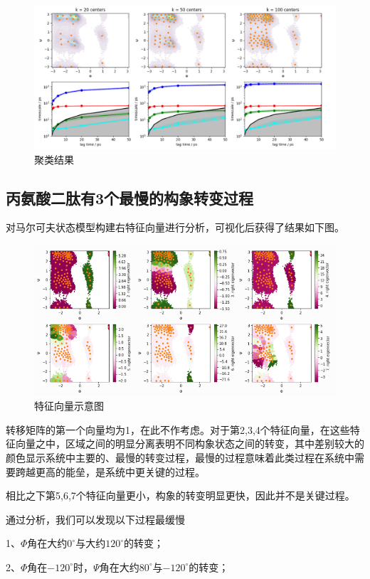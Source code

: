 \documentclass[a4paper]{article}
\begin{document}
\begin{CJK}{UTF8}{gbsn}
\begin{sloppypar}
\begin{figure}[H]
\centering
\includegraphics[scale=0.55]{impied.png}
\caption{聚类结果}
\end{figure}


	\subsection{丙氨酸二肽有3个最慢的构象转变过程}
	
	对马尔可夫状态模型构建右特征向量进行分析，可视化后获得了结果如下图。
\begin{figure}[H]
\centering
\includegraphics[scale=0.68]{right.png}
\caption{特征向量示意图}
\end{figure}
	转移矩阵的第一个向量均为1，在此不作考虑。对于第2,3,4个特征向量，在这些特征向量之中，区域之间的明显分离表明不同构象状态之间的转变，其中差别较大的颜色显示系统中主要的、最慢的转变过程，最慢的过程意味着此类过程在系统中需要跨越更高的能垒，是系统中更关键的过程。

	相比之下第5,6,7个特征向量更小，构象的转变明显更快，因此并不是关键过程。
	
	通过分析，我们可以发现以下过程最缓慢

	1、$\Phi$角在大约$0^{\circ}$与大约$120^{\circ}$的转变；

	2、$\Phi$角在$-120^{\circ}$时，$\Psi$角在大约$80^{\circ}$与$-120^{\circ}$的转变；


\end{sloppypar}
\end{CJK}
\end{document}
